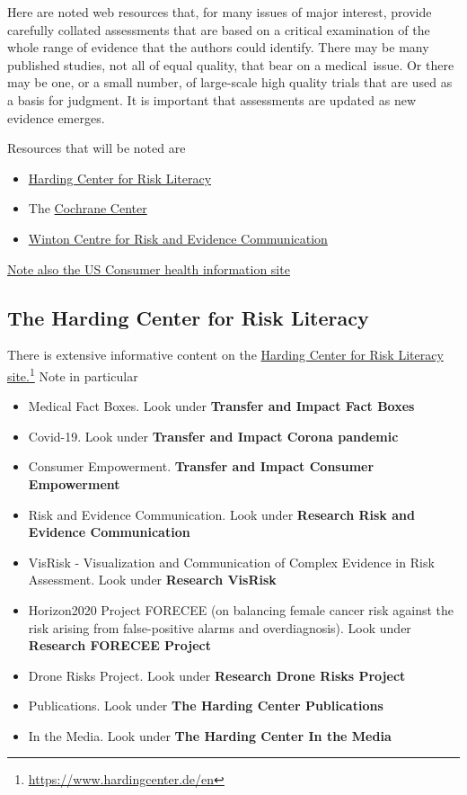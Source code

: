 \documentclass[
  10ptls,
  b5paper]{book}
\providecommand{\tightlist}{%
  \setlength{\itemsep}{0pt}\setlength{\parskip}{0pt}}
\begin{document}
Here are noted web resources that, for many issues of major interest, provide carefully collated assessments that are based on a critical examination of the whole range of evidence that the authors could identify. There may be many published studies, not all of equal quality, that bear on a medical~issue. Or there may be one, or a small number, of large-scale high quality trials that are used as a basis for judgment. It is important that assessments are updated as new evidence emerges.

Resources that will be noted are

\begin{itemize}
\tightlist
\item
  \href{https://www.hardingcenter.de/en}{Harding Center for Risk Literacy}
\item
  The \href{https://www.cochrane.org/}{Cochrane Center}
\item
  \href{https://wintoncentre.maths.cam.ac.uk/}{Winton Centre for Risk and Evidence Communication}
\end{itemize}

\href{https://medlineplus.gov/}{Note also the US Consumer health information site}

\subsection*{The Harding Center for Risk Literacy}\label{the-harding-center-for-risk-literacy}

There is extensive informative content on the \href{https://www.hardingcenter.de/en}{Harding Center for Risk Literacy site.}\footnote{\url{https://www.hardingcenter.de/en}} Note in particular

\begin{itemize}
\tightlist
\item
  Medical Fact Boxes. Look under \textbf{Transfer and Impact \textbar{} Fact Boxes}
\item
  Covid-19. Look under \textbf{Transfer and Impact \textbar{} Corona pandemic}
\item
  Consumer Empowerment. \textbf{Transfer and Impact \textbar{} Consumer Empowerment}
\item
  Risk and Evidence Communication. Look under \textbf{Research \textbar{} Risk and Evidence Communication}
\item
  VisRisk - Visualization and Communication of Complex Evidence in Risk Assessment. Look under \textbf{Research \textbar{} VisRisk}
\item
  Horizon2020 Project FORECEE (on balancing female cancer risk against the risk arising from false-positive alarms and overdiagnosis). Look under \textbf{Research \textbar{} FORECEE Project}
\item
  Drone Risks Project. Look under \textbf{Research \textbar{} Drone Risks Project}
\item
  Publications. Look under \textbf{The Harding Center \textbar{} Publications}
\item
  In the Media. Look under \textbf{The Harding Center \textbar{} In the Media}
\end{itemize}
\end{document}
